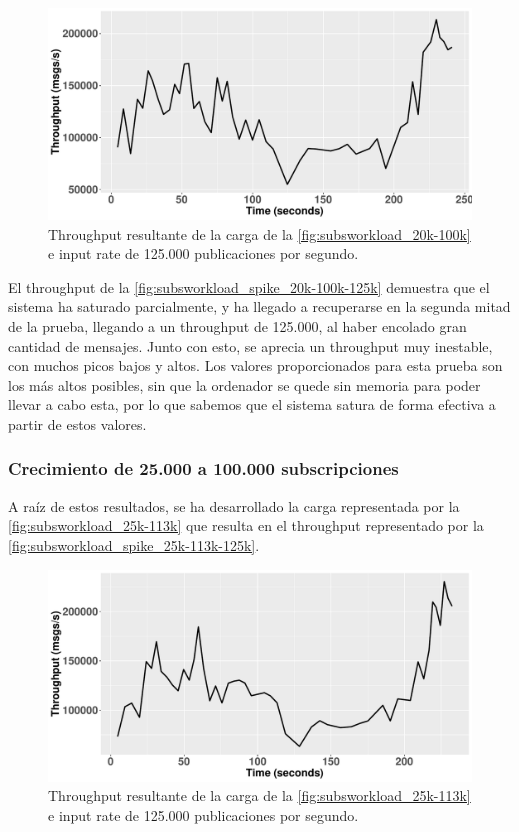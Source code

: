 \begin{figure}[htpb]
    \centering
    \includegraphics[width=\textwidth]{images/throguhput_spike_20k-100k-125k.pdf}
    \caption{Throughput resultante de la carga de la \autoref{fig:subsworkload_20k-100k} e input rate de 125.000 publicaciones por segundo.}
    \label{fig:subsworkload_spike_20k-100k-125k}
\end{figure}

El throughput de la \autoref{fig:subsworkload_spike_20k-100k-125k} demuestra que
el sistema ha saturado parcialmente, y ha llegado a recuperarse en la segunda mitad
de la prueba, llegando a un throughput de 125.000, al haber encolado gran cantidad de
mensajes. Junto con esto, se aprecia un throughput muy inestable, con muchos picos
bajos y altos. Los valores proporcionados para esta prueba son los más altos posibles,
sin que la ordenador se quede sin memoria para poder llevar a cabo esta, por lo que
sabemos que el sistema satura de forma efectiva a partir de estos valores.

\subsubsection*{Crecimiento de 25.000 a 100.000 subscripciones}

A raíz de estos resultados, se ha desarrollado la carga representada por la 
\autoref{fig:subsworkload_25k-113k} que resulta en el throughput representado por 
la \autoref{fig:subsworkload_spike_25k-113k-125k}.

\begin{figure}[htpb]
    \centering
    \includegraphics[width=\textwidth]{images/throguhput_spike_20k-113k-125k.pdf}
    \caption{Throughput resultante de la carga de la \autoref{fig:subsworkload_25k-113k} e input rate de 125.000 publicaciones por segundo.}
    \label{fig:subsworkload_spike_25k-113k-125k}
\end{figure}


